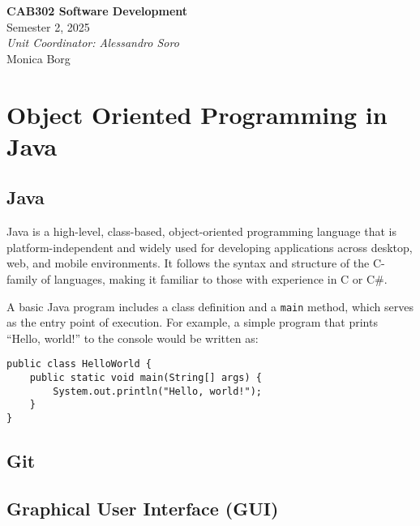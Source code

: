 \documentclass{article}
\date{}
\newcommand{\unitName}{CAB302 Software Development}
\newcommand{\unitTime}{Semester 2, 2025}
\newcommand{\unitCoordinator}{Unit Coordinator: Alessandro Soro}
\newcommand{\documentAuthors}{Monica Borg}
\begin{document}
%
\begin{titlepage}
    \vspace*{\fill}
    \begin{center}
        \LARGE{\textbf{\unitName}} \\[0.1in]
        \normalsize{\unitTime} \\[0.2in]
        \normalsize\textit{\unitCoordinator} \\[0.2in]
        \documentAuthors
    \end{center}
    \vspace*{\fill}
    \thispagestyle{empty}
\end{titlepage}
\newpage
%
\tableofcontents
\newpage
%
\section{Object Oriented Programming in Java}

\subsection{Java}
Java is a high-level, class-based, object-oriented programming language that is platform-independent and widely used for developing applications across desktop, web, and mobile environments. It follows the syntax and structure of the C-family of languages, making it familiar to those with experience in C or C\#.

A basic Java program includes a class definition and a \texttt{main} method, which serves as the entry point of execution. For example, a simple program that prints ``Hello, world!'' to the console would be written as:

\begin{lstlisting}
public class HelloWorld {
    public static void main(String[] args) {
        System.out.println("Hello, world!");
    }
}
\end{lstlisting}

\subsubsection{}
\subsection{Git}

\subsection{Graphical User Interface (GUI)}
\end{document}
